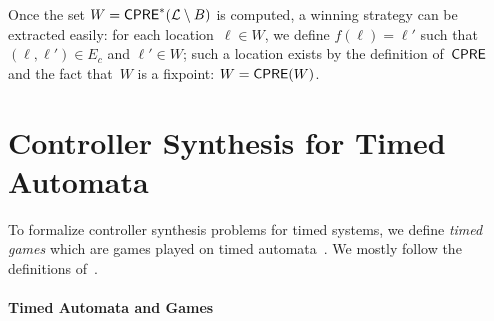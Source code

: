 \documentclass{article}
\begin{document}
Once the set $W = \textrm{\sf CPRE}^*(\mathcal{L}\setminus B)$ is computed, a winning strategy can be
extracted easily: for each location~$\ell \in W$, we define $f(\ell) = \ell'$ such
that $(\ell,\ell') \in E_c$ and $\ell' \in W$; such a location exists by the
definition of~$\textrm{\sf CPRE}$ and the fact that~$W$ is a fixpoint: $W = \textrm{\sf CPRE}(W)$.

\section{Controller Synthesis for Timed Automata}
To formalize controller synthesis problems for timed
systems, we define \emph{timed games} which are games played on timed
automata~\cite{AD-tcs94}. We mostly follow the definitions of~\cite{Cassez05}.

\paragraph{Timed Automata and Games}

\end{document}
